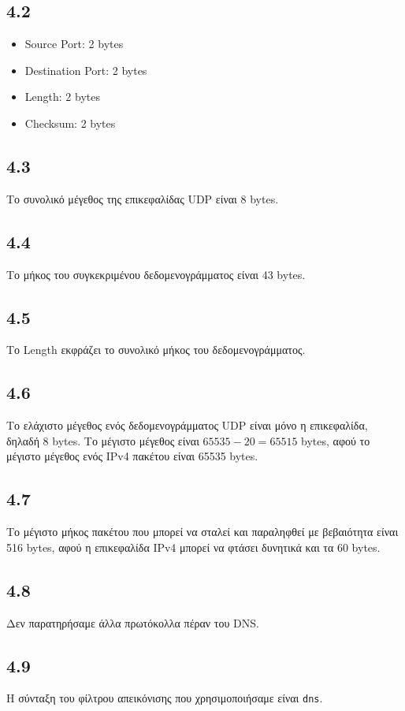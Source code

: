 		\subsection*{4.2}
			\begin{itemize}
				\item Source Port: 2 bytes
				\item Destination Port: 2 bytes
				\item Length: 2 bytes
				\item Checksum: 2 bytes
			\end{itemize}

		\subsection*{4.3}
			Το συνολικό μέγεθος της επικεφαλίδας UDP είναι 8 bytes.

		\subsection*{4.4}
			Το μήκος του συγκεκριμένου δεδομενογράμματος είναι 43 bytes.

		\subsection*{4.5}
			 Το Length εκφράζει το συνολικό μήκος του δεδομενογράμματος.

		\subsection*{4.6}
			Το ελάχιστο μέγεθος ενός δεδομενογράμματος UDP είναι μόνο η επικεφαλίδα, δηλαδή 8 bytes. Το μέγιστο μέγεθος είναι $65535-20 = 65515$ bytes, αφού το μέγιστο μέγεθος ενός IPv4 πακέτου είναι 65535 bytes.

		\subsection*{4.7}
			Το μέγιστο μήκος πακέτου που μπορεί να σταλεί και παραληφθεί με βεβαιότητα είναι 516 bytes, αφού η επικεφαλίδα IPv4 μπορεί να φτάσει δυνητικά και τα 60 bytes.

		\subsection*{4.8}
			Δεν παρατηρήσαμε άλλα πρωτόκολλα πέραν του DNS.

		\subsection*{4.9}
			Η σύνταξη του φίλτρου απεικόνισης που χρησιμοποιήσαμε είναι \verb|dns|.

